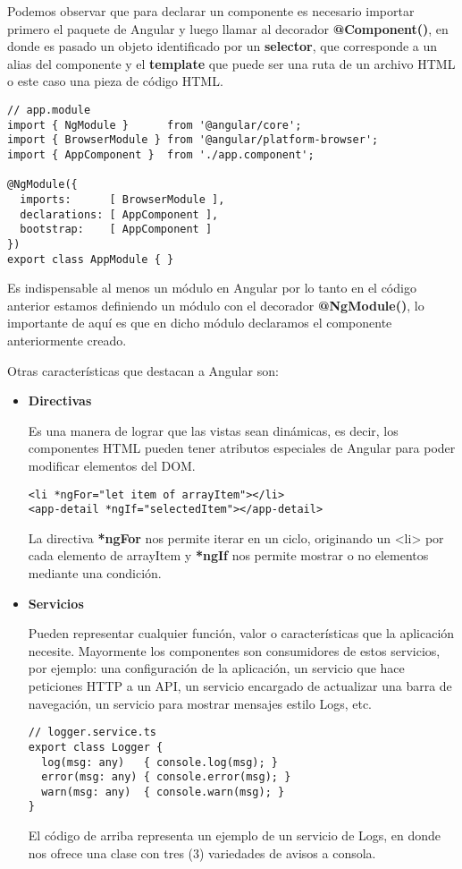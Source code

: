 Podemos observar que para declarar un componente es necesario importar primero el paquete de Angular y luego llamar al decorador \textbf{@Component({})}, en donde es pasado un objeto identificado por un \textbf{selector}, que corresponde a un alias del componente y el \textbf{template} que puede ser una ruta de un archivo HTML o este caso una pieza de código HTML.

\begin{lstlisting}
// app.module
import { NgModule }      from '@angular/core';
import { BrowserModule } from '@angular/platform-browser';
import { AppComponent }  from './app.component';

@NgModule({
  imports:      [ BrowserModule ],
  declarations: [ AppComponent ],
  bootstrap:    [ AppComponent ]
})
export class AppModule { }
\end{lstlisting}

Es indispensable al menos un módulo en Angular por lo tanto en el código anterior estamos definiendo un módulo con el decorador \textbf{@NgModule({})}, lo importante de aquí es que en dicho módulo declaramos el componente anteriormente creado.

Otras características que destacan a Angular son:

\begin{itemize}
\item\textbf{Directivas}

Es una manera de lograr que las vistas sean dinámicas, es decir, los componentes HTML pueden tener atributos especiales de Angular para poder modificar elementos del DOM.
\begin{lstlisting}
<li *ngFor="let item of arrayItem"></li>
<app-detail *ngIf="selectedItem"></app-detail>
\end{lstlisting}
La directiva \textbf{*ngFor} nos permite iterar en un ciclo, originando un <li> por cada elemento de arrayItem y \textbf{*ngIf} nos permite mostrar o no elementos mediante una condición.

\item\textbf{Servicios}

Pueden representar cualquier función, valor o características que la aplicación necesite. Mayormente los componentes son consumidores de estos servicios, por ejemplo: una configuración de la aplicación, un servicio que hace peticiones HTTP a un API, un servicio encargado de actualizar una barra de navegación, un servicio para mostrar mensajes estilo Logs, etc.
\begin{lstlisting}
// logger.service.ts
export class Logger {
  log(msg: any)   { console.log(msg); }
  error(msg: any) { console.error(msg); }
  warn(msg: any)  { console.warn(msg); }
}
\end{lstlisting}
El código de arriba representa un ejemplo de un servicio de Logs, en donde nos ofrece una clase con tres (3) variedades de avisos a consola.
\end{itemize}

